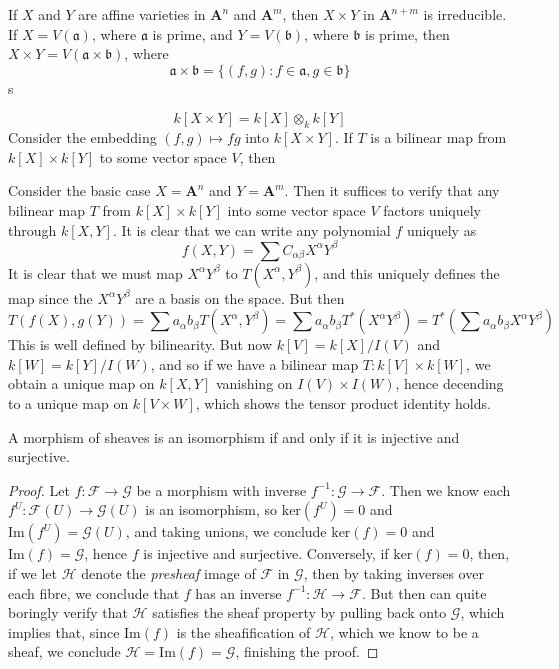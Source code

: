 If $X$ and $Y$ are affine varieties in $\mathbf{A}^n$ and $\mathbf{A}^m$, then $X \times Y$ in $\mathbf{A}^{n+m}$ is irreducible. If $X = V(\mathfrak{a})$, where $\mathfrak{a}$ is prime, and $Y = V(\mathfrak{b})$, where $\mathfrak{b}$ is prime, then $X \times Y = V(\mathfrak{a} \times \mathfrak{b})$, where
%
\[ \mathfrak{a} \times \mathfrak{b} = \{ (f,g) : f \in \mathfrak{a}, g \in \mathfrak{b} \} \]
%
s

\[ k[X \times Y] = k[X] \otimes_k k[Y] \]
%
Consider the embedding $(f,g) \mapsto fg$ into $k[X \times Y]$. If $T$ is a bilinear map from $k[X] \times k[Y]$ to some vector space $V$, then 

Consider the basic case $X = \mathbf{A}^n$ and $Y = \mathbf{A}^m$. Then it suffices to verify that any bilinear map $T$ from $k[X] \times k[Y]$ into some vector space $V$ factors uniquely through $k[X, Y]$. It is clear that we can write any polynomial $f$ uniquely as
%
\[ f(X,Y) = \sum C_{\alpha \beta} X^\alpha Y^\beta \]
%
It is clear that we must map $X^\alpha Y^\beta$ to $T(X^\alpha, Y^\beta)$, and this uniquely defines the map since the $X^\alpha Y^\beta$ are a basis on the space. But then
%
\[ T(f(X), g(Y)) = \sum a_\alpha b_\beta T(X^\alpha, Y^\beta) = \sum a_\alpha b_\beta T^*(X^\alpha Y^\beta) = T^* \left(\sum a_\alpha b_\beta X^\alpha Y^\beta \right) \]
%
This is well defined by bilinearity. But now $k[V] = k[X]/I(V)$ and $k[W] = k[Y]/I(W)$, and so if we have a bilinear map $T: k[V] \times k[W]$, we obtain a unique map on $k[X,Y]$ vanishing on $I(V) \times I(W)$, hence decending to a unique map on $k[V \times W]$, which shows the tensor product identity holds.

\begin{theorem}
    A morphism of sheaves is an isomorphism if and only if it is injective and surjective.
\end{theorem}
\begin{proof}
    Let $f: \mathcal{F} \to \mathcal{G}$ be a morphism with inverse $f^{-1}: \mathcal{G} \to \mathcal{F}$. Then we know each $f^U: \mathcal{F}(U) \to \mathcal{G}(U)$ is an isomorphism, so $\text{ker}(f^U) = 0$ and $\text{Im}(f^U) = \mathcal{G}(U)$, and taking unions, we conclude $\text{ker}(f) = 0$ and $\text{Im}(f) = \mathcal{G}$, hence $f$ is injective and surjective. Conversely, if $\text{ker}(f) = 0$, then, if we let $\mathcal{H}$ denote the {\it presheaf} image of $\mathcal{F}$ in $\mathcal{G}$, then by taking inverses over each fibre, we conclude that $f$ has an inverse $f^{-1}: \mathcal{H} \to \mathcal{F}$. But then can quite boringly verify that $\mathcal{H}$ satisfies the sheaf property by pulling back onto $\mathcal{G}$, which implies that, since $\text{Im}(f)$ is the sheafification of $\mathcal{H}$, which we know to be a sheaf, we conclude $\mathcal{H} = \text{Im}(f) = \mathcal{G}$, finishing the proof.
\end{proof}

